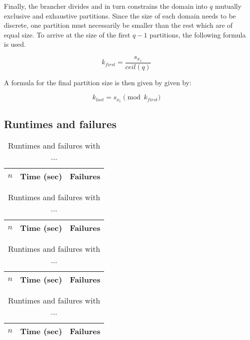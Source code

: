 \documentclass[a4paper,11pt]{article}
\begin{document}
Finally, the brancher divides and in turn constrains the domain into $q$ mutually exclusive and exhaustive partitions. Since the size of each domain needs to be discrete, one partition must necessarily be smaller than the rest which are of equal size. To arrive at the size of the first $q-1$ partitions, the following formula is used.

\begin{equation}
k_{first} = \frac{s_{x_1}}{ceil(q)} 
\end{equation}

A formula for the final partition size is then given by given by:

\begin{equation}
k_{last} = s_{x_1} \pmod{k_{first}}
\end{equation}


\subsection{Runtimes and failures}

\begin{table}[h]
\centering
\begin{tabular}{r|r|r}
$n$ & Time (sec) & Failures \\
\hline   
\end{tabular}
\caption{Runtimes and failures with ...} 
\end{table}

\begin{table}[h]
\centering
\begin{tabular}{r|r|r}
$n$ & Time (sec) & Failures \\
\hline   
\end{tabular}
\caption{Runtimes and failures with ...} 
\end{table}

\begin{table}[h]
\centering
\begin{tabular}{r|r|r}
$n$ & Time (sec) & Failures \\
\hline   
\end{tabular}
\caption{Runtimes and failures with ...} 
\end{table}

\begin{table}[h]
\centering
\begin{tabular}{r|r|r}
$n$ & Time (sec) & Failures \\
\hline   
\end{tabular}
\caption{Runtimes and failures with ...} 
\end{table}
\end{document}
